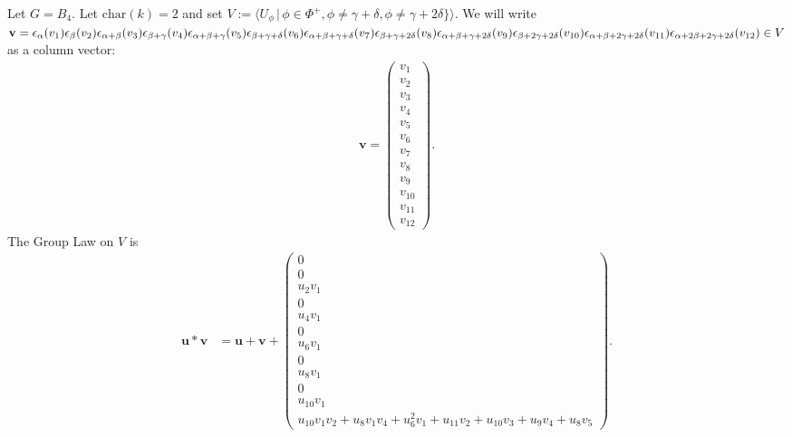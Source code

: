 Let $G = B_4$. Let $\mathrm{char}(k)=2$ and set $V:=\langle U_\phi\, |\, \phi \in \Phi^+, \phi \neq \gamma + \delta,\phi \neq \gamma+2\delta\} \rangle$. We will write
$
\mathbf{v} = \epsilon_\alpha(v_1) \epsilon_\beta(v_2) \epsilon_{\alpha+\beta}(v_3) \epsilon_{\beta+\gamma}(v_4) \epsilon_{\alpha+\beta+\gamma}(v_5) \epsilon_{\beta+\gamma+\delta}(v_6) \epsilon_{\alpha+\beta+\gamma+\delta}(v_7) \epsilon_{\beta+\gamma+2\delta}(v_8) \epsilon_{\alpha+\beta+\gamma+2\delta}(v_9) \\
\epsilon_{\beta+2\gamma+2\delta}(v_{10}) \epsilon_{\alpha+\beta+2\gamma+2\delta}(v_{11}) \epsilon_{\alpha+2\beta+2\gamma+2\delta}(v_{12}) \in V
$
as a column vector:
\begin{align*}
\mathbf{v} = \left( \begin{matrix}
	         v_1 \\
	         v_2 \\
	         v_3 \\
	         v_4 \\
	         v_5 \\
	         v_6 \\
	         v_7 \\
	         v_8 \\
	         v_9 \\
	         v_{10} \\
	         v_{11} \\
	         v_{12} 
	      \end{matrix}\right). 
\end{align*}
The Group Law on $V$ is
\begin{align*}
	     \mathbf{u}*
	     \mathbf{v}&=
	     \mathbf{u} + \mathbf{v} +
	     \left( \begin{matrix}
	         0 \\
	         0 \\
	         u_2v_1\\
	         0 \\
	         u_4v_1 \\
	         0 \\
	         u_6v_1\\
	         0 \\
	         u_8v_1\\
	         0 \\
	         u_{10}v_1\\
	         u_{10}v_1v_2 + u_8v_1v_4 + u_6^2v_1 + u_{11}v_2 + u_{10}v_3 + u_9v_4 + u_8v_5
	         	\end{matrix}\right).
\end{align*}


